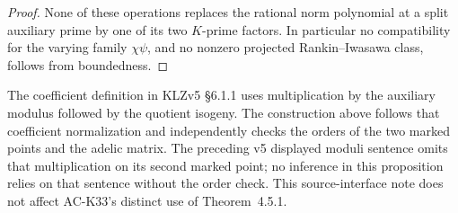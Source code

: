 \begin{proof}
None of these operations replaces the rational norm
polynomial at a split auxiliary prime by one of its
two \(K\)-prime factors.  In particular no compatibility
for the varying family \(\chi\psi\), and no nonzero
projected Rankin--Iwasawa class, follows from boundedness.
\end{proof}

\begin{remark}
The coefficient definition in KLZv5 \S6.1.1 uses
multiplication by the auxiliary modulus followed by
the quotient isogeny.  The construction above follows
that coefficient normalization and independently checks
the orders of the two marked points and the adelic
matrix.  The preceding v5 displayed moduli sentence
omits that multiplication on its second marked point;
no inference in this proposition relies on that
sentence without the order check.  This source-interface
note does not affect AC-K33's distinct use of
Theorem~4.5.1.
\end{remark}

